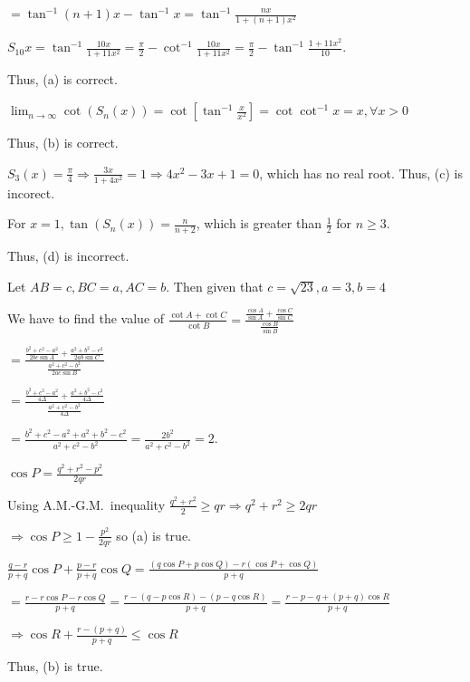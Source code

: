   $= \tan^{-1}(n + 1)x - \tan^{-1}x = \tan^{-1}\frac{nx}{1 + (n + 1)x^2}$

  $S_{10}x = \tan^{-1}\frac{10x}{1 + 11x^2} = \frac{\pi}{2} - \cot^{-1}\frac{10x}{1 + 11x^2} = \frac{\pi}{2}
  - \tan^{-1}\frac{1 + 11x^2}{10}$.

  Thus, (a) is correct.

  $\displaystyle\lim_{n\to\infty}\cot\left(S_n(x)\right) = \cot\left[\tan^{-1}\frac{x}{x^2}\right]
  = \cot\cot^{-1}x = x, \forall x > 0$

  Thus, (b) is correct.

  $S_3(x) = \frac{\pi}{4}\Rightarrow \frac{3x}{1 + 4x^2} = 1 \Rightarrow 4x^2 - 3x + 1 = 0$, which has no
  real root. Thus, (c) is incorect.

  For $x = 1, \tan\left(S_n(x)\right) = \frac{n}{n + 2}$, which is greater than $\frac{1}{2}$ for $n\ge 3$.

  Thus, (d) is incorrect.
\item Let $AB = c, BC = a, AC = b$. Then given that $c = \sqrt{23}, a = 3, b = 4$

  We have to find the value of $\frac{\cot A + \cot C}{\cot B} = \frac{\frac{\cos A}{\sin A} + \frac{\cos
      C}{\sin C}}{\frac{\cos B}{\sin B}}$

  $= \frac{\frac{b^2 + c^2 - a^2}{2bc\sin A} + \frac{a^2 + b^2 - c^2}{2ab\sin C}}{\frac{a^2 + c^2 -
      b^2}{2ac\sin B}}$

  $= \frac{\frac{b^2 + c^2 - a^2}{4\Delta} + \frac{a^2 + b^2 - c^2}{4\Delta}}{\frac{a^2 + c^2 -
      b^2}{4\Delta}}$

  $= \frac{b^2 + c^2 - a^2 + a^2 + b^2 - c^2}{a^2 + c^2 - b^2} = \frac{2b^2}{a^2 + c^2 - b^2} = 2$.
\item $\cos P = \frac{q^2 + r^2 - p^2}{2qr}$

  Using A.M.-G.M.\ inequality $\frac{q^2 + r^2}{2}\ge qr\Rightarrow q^2 + r^2\ge 2qr$

  $\Rightarrow \cos P\ge 1- \frac{p^2}{2qr}$ so (a) is true.

  $\frac{q - r}{p + q}\cos P + \frac{p - r}{p + q}\cos Q = \frac{(q\cos P + p\cos Q) - r(\cos P + \cos Q)}{p
    + q}$

  $= \frac{r - r\cos P - r\cos Q}{p + q} = \frac{r - (q - p\cos R) - (p - q\cos R)}{p + q} = \frac{r - p - q +
    (p + q)\cos R}{p + q}$

  $\Rightarrow \cos R + \frac{r - (p + q)}{p + q}\le \cos R$

  Thus, (b) is true.

